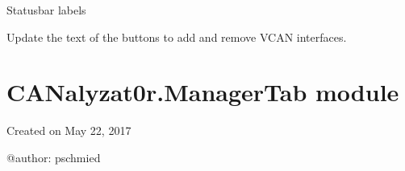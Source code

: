 \documentclass[letterpaper,10pt,english]{sphinxmanual}
\begin{document}
\begin{fulllineitems}
\begin{fulllineitems}
\label{\detokenize{src:src.MainTab.MainTab.statusBarApplicationStatus}}
Statusbar labels

\end{fulllineitems}


\begin{fulllineitems}
\label{\detokenize{src:src.MainTab.MainTab.statusBarInterface}}
\end{fulllineitems}


\begin{fulllineitems}
\label{\detokenize{src:src.MainTab.MainTab.statusBarProject}}
\end{fulllineitems}


\begin{fulllineitems}
\label{\detokenize{src:src.MainTab.MainTab.updateVCANButtons}}
Update the text of the buttons to add and remove VCAN interfaces.

\end{fulllineitems}


\end{fulllineitems}



\section{CANalyzat0r.ManagerTab module}
\label{\detokenize{src:canalyzat0r-managertab-module}}\label{\detokenize{src:module-src.ManagerTab}}
Created on May 22, 2017

@author: pschmied
\end{document}
